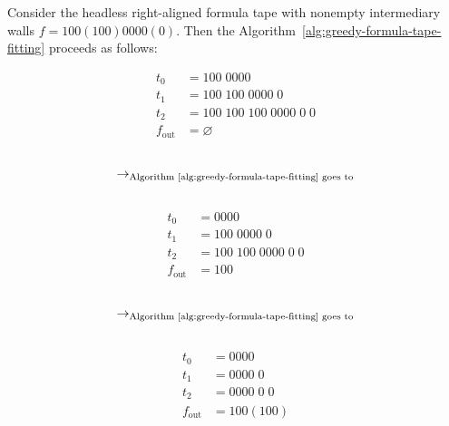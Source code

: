 \begin{example}
    Consider the headless right-aligned formula tape with nonempty intermediary walls $f=100(100)0000(0)$. Then the Algorithm~\ref{alg:greedy-formula-tape-fitting} proceeds as follows:

    \begin{multicols}{5}
        \noindent
        \begin{align*}
            t_0          & = 100\; 0000                      \\
            t_1          & = 100\; 100\; 0000 \; 0           \\
            t_2          & = 100\; 100\; 100\; 0000 \; 0\; 0 \\
            f_\text{out} & = \varnothing
        \end{align*}
        \begin{align*}
             &                                                                   \\
            \to_{\text{Algorithm~\ref{alg:greedy-formula-tape-fitting} goes to}} \\
             &
        \end{align*}
        \begin{align*}
            t_0          & = 0000                      \\
            t_1          & = 100\; 0000 \; 0           \\
            t_2          & = 100\; 100\; 0000 \; 0\; 0 \\
            f_\text{out} & = 100
        \end{align*}
        \begin{align*}
             &                                                                   \\
            \to_{\text{Algorithm~\ref{alg:greedy-formula-tape-fitting} goes to}} \\
             &
        \end{align*}
        \begin{align*}
            t_0          & = 0000           \\
            t_1          & =  0000 \; 0     \\
            t_2          & =  0000 \; 0\; 0 \\
            f_\text{out} & = 100 (100)
        \end{align*}
    \end{multicols}
    \begin{multicols}{5}

\end{multicols}
\end{example}
